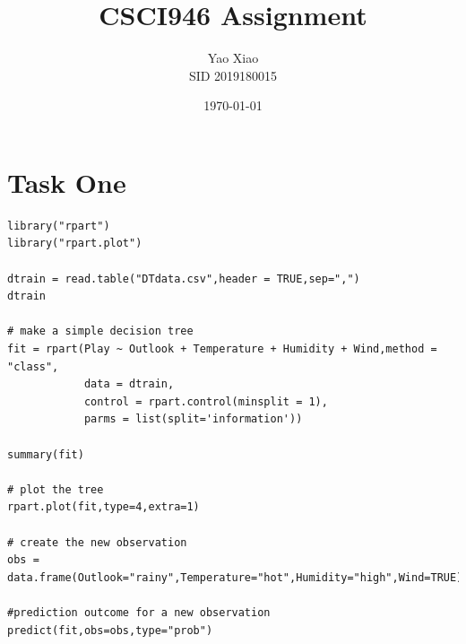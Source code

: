 \documentclass{article}
\title{CSCI946 Assignment}
\author{Yao Xiao \\ SID 2019180015}
\date{\today}
\begin{document}
\maketitle

\section{Task One}
\begin{lstlisting}
library("rpart")
library("rpart.plot")

dtrain = read.table("DTdata.csv",header = TRUE,sep=",")
dtrain

# make a simple decision tree
fit = rpart(Play ~ Outlook + Temperature + Humidity + Wind,method = "class",
            data = dtrain,
            control = rpart.control(minsplit = 1),
            parms = list(split='information'))

summary(fit)

# plot the tree
rpart.plot(fit,type=4,extra=1)

# create the new observation
obs = data.frame(Outlook="rainy",Temperature="hot",Humidity="high",Wind=TRUE)

#prediction outcome for a new observation
predict(fit,obs=obs,type="prob")

\end{lstlisting}
\end{document}
